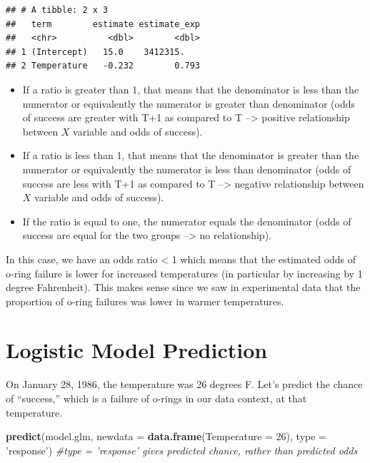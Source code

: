 \documentclass[
]{book}
\newenvironment{Shaded}{\begin{snugshade}}{\end{snugshade}}
\newcommand{\CommentTok}[1]{\textcolor[rgb]{0.56,0.35,0.01}{\textit{#1}}}
\newcommand{\DataTypeTok}[1]{\textcolor[rgb]{0.13,0.29,0.53}{#1}}
\newcommand{\DecValTok}[1]{\textcolor[rgb]{0.00,0.00,0.81}{#1}}
\newcommand{\KeywordTok}[1]{\textcolor[rgb]{0.13,0.29,0.53}{\textbf{#1}}}
\newcommand{\NormalTok}[1]{#1}
\newcommand{\StringTok}[1]{\textcolor[rgb]{0.31,0.60,0.02}{#1}}
\begin{document}
\begin{verbatim}
## # A tibble: 2 x 3
##   term        estimate estimate_exp
##   <chr>          <dbl>        <dbl>
## 1 (Intercept)   15.0    3412315.   
## 2 Temperature   -0.232        0.793
\end{verbatim}

\begin{itemize}
\item
  If a ratio is greater than 1, that means that the denominator is less than the numerator or equivalently the numerator is greater than denominator (odds of success are greater with T+1 as compared to T --\textgreater{} positive relationship between \(X\) variable and odds of success).
\item
  If a ratio is less than 1, that means that the denominator is greater than the numerator or equivalently the numerator is less than denominator (odds of success are less with T+1 as compared to T --\textgreater{} negative relationship between \(X\) variable and odds of success).
\item
  If the ratio is equal to one, the numerator equals the denominator (odds of success are equal for the two groups --\textgreater{} no relationship).
\end{itemize}

In this case, we have an odds ratio \textless{} 1 which means that the estimated odds of o-ring failure is lower for increased temperatures (in particular by increasing by 1 degree Fahrenheit). This makes sense since we saw in experimental data that the proportion of o-ring failures was lower in warmer temperatures.

\hypertarget{logistic-model-prediction}{%
\section{Logistic Model Prediction}\label{logistic-model-prediction}}

On January 28, 1986, the temperature was 26 degrees F. Let's predict the chance of ``success,'' which is a failure of o-rings in our data context, at that temperature.

\begin{Shaded}
\begin{Highlighting}[]
\KeywordTok{predict}\NormalTok{(model.glm, }\DataTypeTok{newdata =} \KeywordTok{data.frame}\NormalTok{(}\DataTypeTok{Temperature =} \DecValTok{26}\NormalTok{), }\DataTypeTok{type =} \StringTok{'response'}\NormalTok{) }\CommentTok{#type = 'response' gives predicted chance, rather than predicted odds}
\end{Highlighting}
\end{Shaded}
\end{document}
